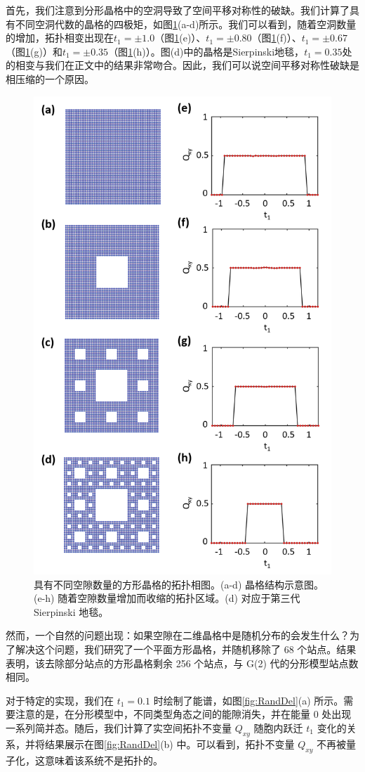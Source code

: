 首先，我们注意到分形晶格中的空洞导致了空间平移对称性的破缺。我们计算了具有不同空洞代数的晶格的四极矩，如图\ref{fig:Reason}(a-d)所示。我们可以看到，随着空洞数量的增加，拓扑相变出现在$t_1=\pm1.0$（图\ref{fig:Reason}(e)）、$t_1=\pm0.80$（图\ref{fig:Reason}(f)）、$t_1=\pm0.67$（图\ref{fig:Reason}(g)）和$t_1=\pm0.35$（图\ref{fig:Reason}(h)）。图(d)中的晶格是Sierpinski地毯，$t_1=0.35$处的相变与我们在正文中的结果非常吻合。因此，我们可以说空间平移对称性破缺是相压缩的一个原因。

\begin{figure}[htbp]
    \centering
    \includegraphics[width=0.5\linewidth]{figure/HOTITheo/Reason.png}
    \caption{具有不同空隙数量的方形晶格的拓扑相图。(a-d) 晶格结构示意图。(e-h) 随着空隙数量增加而收缩的拓扑区域。(d) 对应于第三代 Sierpinski 地毯。}
    \label{fig:Reason}
\end{figure}

然而，一个自然的问题出现：如果空隙在二维晶格中是随机分布的会发生什么？为了解决这个问题，我们研究了一个平面方形晶格，并随机移除了 68 个站点。结果表明，该去除部分站点的方形晶格剩余 256 个站点，与 G(2) 代的分形模型站点数相同。

对于特定的实现，我们在 \( t_1 = 0.1 \) 时绘制了能谱，如图\ref{fig:RandDel}(a) 所示。需要注意的是，在分形模型中，不同类型角态之间的能隙消失，并在能量 \( 0 \) 处出现一系列简并态。随后，我们计算了实空间拓扑不变量 \( Q_{xy} \) 随胞内跃迁 \( t_1 \) 变化的关系，并将结果展示在图\ref{fig:RandDel}(b) 中。可以看到，拓扑不变量 \( Q_{xy} \) 不再被量子化，这意味着该系统不是拓扑的。

